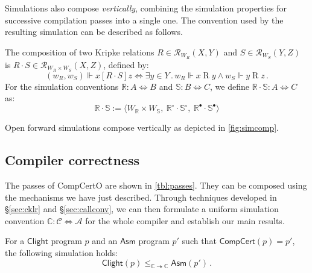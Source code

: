 \documentclass[sigplan,screen]{acmart}
\newcommand{\kw}[1]{\ensuremath{ \mathsf{#1} }}
\newcommand{\ifr}[1]{\mathrel{[{#1}]}}
\newcommand{\que}{\circ}
\newcommand{\ans}{\bullet}
\begin{document}
Simulations also compose \emph{vertically},
combining the
simulation properties for successive compilation passes
into a single one.
The convention used by the resulting simulation
can be described as follows.

\begin{definition} %
The composition of two Kripke relations
$R \in \mathcal{R}_{W_R}(X, Y)$ and
$S \in \mathcal{R}_{W_S}(Y, Z)$
is %
$R \cdot S \in \mathcal{R}_{W_R \times W_S}(X, Z)$,
defined by:
\[
  (w_R, w_S) \Vdash x \ifr{R \cdot S} z \Leftrightarrow
  \exists y \in Y \,.\,
    w_R \Vdash x \mathrel{R} y \wedge
    w_S \Vdash y \mathrel{R} z \,.
\]
For the simulation conventions
$\mathbb{R} : A \Leftrightarrow B$ and
$\mathbb{S} : B \Leftrightarrow C$,
we define
$\mathbb{R} \cdot \mathbb{S} : A \Leftrightarrow C$ as:
\[
  \mathbb{R} \cdot \mathbb{S} :=
  \langle
    W_\mathbb{R} \times W_\mathbb{S}, \:
    \mathbb{R}^\que \cdot \mathbb{S}^\que, \:
    \mathbb{R}^\ans \cdot \mathbb{S}^\ans
  \rangle
\]
\end{definition}

\begin{theorem} \label{thm:fsim-vcomp} %
Open forward simulations compose vertically
as depicted in \autoref{fig:simcomp}.
\end{theorem}



\subsection{Compiler correctness} \label{sec:comppass} %

The passes of CompCertO are shown in \autoref{tbl:passes}.
They can be composed using the mechanisms we have just described.
Through techniques developed in \S\ref{sec:cklr} and \S\ref{sec:callconv},
we can then formulate
a uniform simulation convention
$\mathbb{C} : \mathcal{C} \Leftrightarrow \mathcal{A}$
for the whole compiler
and establish our main results.

\begin{theorem} \label{thm:compc} %
For a \kw{Clight} program $p$
and an \kw{Asm} program $p'$ such that
$\kw{CompCert}(p) = p'$,
the following simulation holds:
\[
    \kw{Clight}(p) \le_{\mathbb{C} \twoheadrightarrow \mathbb{C}}
    \kw{Asm}(p') \,.
\]
\end{theorem}
\end{document}
